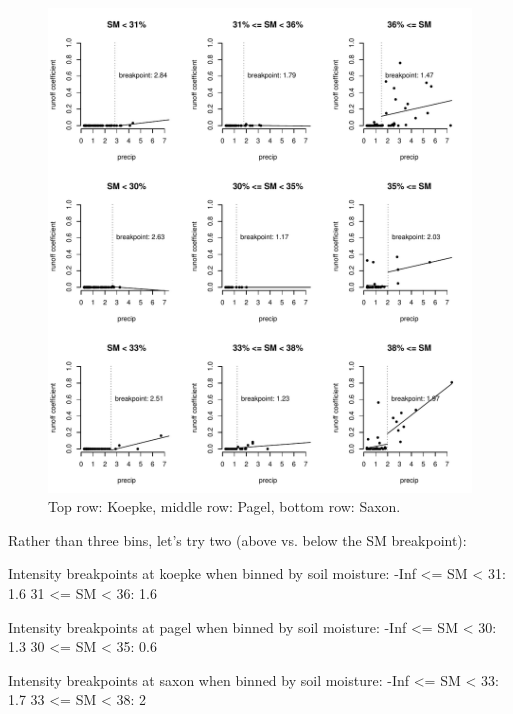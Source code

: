 \documentclass[12pt]{article}
\begin{document}
\begin{figure}
    \begin{center}
\includegraphics{runoff-precip_binned}
    \end{center}
    \caption{Top row: Koepke, middle row: Pagel, bottom row: Saxon.\label{precip_binned}}
\end{figure}


Rather than three bins, let's try two (above vs. below the SM breakpoint):\\


\begin{Schunk}
\begin{Soutput}
Intensity breakpoints at koepke when binned by soil moisture:
-Inf <= SM < 31: 1.6
31 <= SM < 36: 1.6

Intensity breakpoints at pagel when binned by soil moisture:
-Inf <= SM < 30: 1.3
30 <= SM < 35: 0.6

Intensity breakpoints at saxon when binned by soil moisture:
-Inf <= SM < 33: 1.7
33 <= SM < 38: 2
\end{Soutput}
\end{Schunk}
\end{document}
